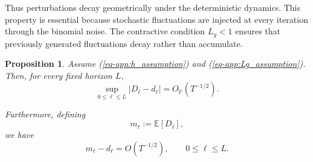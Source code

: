 \documentclass[10pt]{iopart}
\newcommand{\1}{\mathbf{1}}
\newtheorem{prop}{Proposition}[section]
\begin{document}
Thus perturbations decay geometrically under the deterministic dynamics. This property is essential because stochastic fluctuations are injected at every iteration through the binomial noise. The contractive condition $L_g<1$ ensures that previously generated fluctuations decay rather than accumulate.

\begin{prop}
Assume (\ref{eq-app:h_assumption}) and (\ref{eq-app:Lg_assumption}). Then, for every fixed horizon $L$,
\begin{equation}
\sup_{0\le \ell\le L}|D_\ell-d_\ell|
=
O_{\mathbb P}(T^{-1/2}).
\label{eq-app:main_concentration}
\end{equation}

Furthermore, defining
\begin{equation}
m_\ell:=\mathbb E[D_\ell],
\label{eq-app:m_def}
\end{equation}
we have
\begin{equation}
m_\ell-d_\ell
=
O(T^{-1/2}),
\qquad
0\le \ell\le L.
\label{eq-app:mean_concentration}
\end{equation}
\end{prop}
\end{document}
